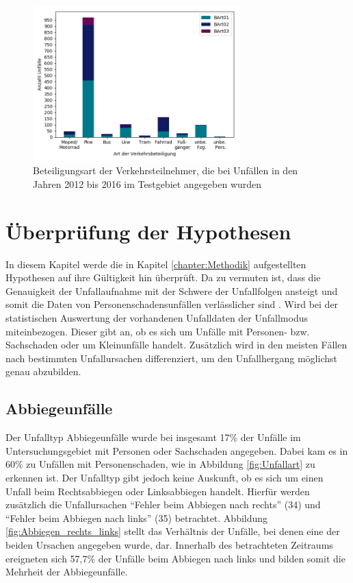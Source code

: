 \begin{savenotes}
	\begin{figure}[H]
		\centering
		\includegraphics[width=8cm,height=6cm]{figures/BArt}
		\caption[Beteiligungsart der Verkehrsteilnehmer, die bei Unfällen in den Jahren 2012 bis 2016 im Testgebiet angegeben wurden]{Beteiligungsart der Verkehrsteilnehmer, die bei Unfällen in den Jahren 2012 bis 2016 im Testgebiet angegeben wurden}\label{fig:Beteiligungsart}
	\end{figure}
\end{savenotes}

\section{Überprüfung der Hypothesen}\label{sechtion:Überprüfung der Thesen}
In diesem Kapitel werde die in Kapitel \ref{chapter:Methodik} aufgestellten Hypothesen auf ihre Gültigkeit hin überprüft. Da zu vermuten ist, dass die Genauigkeit der Unfallaufnahme mit der Schwere der Unfallfolgen ansteigt und somit die Daten von Personenschadensunfällen verlässlicher sind \parencite[S.11]{StatistischesBundesamt.2018b}. Wird bei der statistischen Auswertung der vorhandenen Unfalldaten der Unfallmodus miteinbezogen. Dieser gibt an, ob es sich um Unfälle mit Personen- bzw. Sachschaden oder um Kleinunfälle handelt. Zusätzlich wird in den meisten Fällen nach bestimmten Unfallursachen differenziert, um den Unfallhergang möglichst genau abzubilden. %

\subsection{Abbiegeunfälle}
Der Unfalltyp Abbiegeunfälle wurde bei insgesamt 17\% der Unfälle im Untersuchungsgebiet mit Personen oder Sachschaden angegeben. Dabei kam es in 60\% zu Unfällen mit Personenschaden, wie in Abbildung \ref{fig:Unfallart} zu erkennen ist. Der Unfalltyp gibt jedoch keine Auskunft, ob es sich um einen Unfall beim Rechtsabbiegen oder Linksabbiegen handelt. Hierfür werden zusätzlich die Unfallursachen \enquote{Fehler beim Abbiegen nach rechts} (34) und \enquote{Fehler beim Abbiegen nach links} (35) betrachtet. Abbildung \ref{fig:Abbiegen_rechts_links} stellt das Verhältnis der Unfälle, bei denen eine der beiden Ursachen angegeben wurde, dar. Innerhalb des betrachteten Zeitraums ereigneten sich 57,7\% der Unfälle beim Abbiegen nach links und bilden somit die Mehrheit der Abbiegeunfälle.

